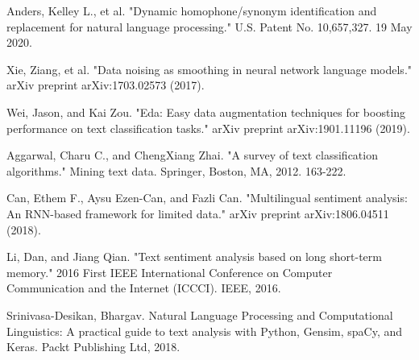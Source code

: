 \documentclass{article}
\begin{document}
\begin{thebibliography}{10}
 Anders, Kelley L., et al. "Dynamic homophone/synonym identification and replacement for natural language processing." U.S. Patent No. 10,657,327. 19 May 2020.

 Xie, Ziang, et al. "Data noising as smoothing in neural network language models." arXiv preprint arXiv:1703.02573 (2017).

 Wei, Jason, and Kai Zou. "Eda: Easy data augmentation techniques for boosting performance on text classification tasks." arXiv preprint arXiv:1901.11196 (2019).

 Aggarwal, Charu C., and ChengXiang Zhai. "A survey of text classification algorithms." Mining text data. Springer, Boston, MA, 2012. 163-222.

 Can, Ethem F., Aysu Ezen-Can, and Fazli Can. "Multilingual sentiment analysis: An RNN-based framework for limited data." arXiv preprint arXiv:1806.04511 (2018).

 Li, Dan, and Jiang Qian. "Text sentiment analysis based on long short-term memory." 2016 First IEEE International Conference on Computer Communication and the Internet (ICCCI). IEEE, 2016.

 Srinivasa-Desikan, Bhargav. Natural Language Processing and Computational Linguistics: A practical guide to text analysis with Python, Gensim, spaCy, and Keras. Packt Publishing Ltd, 2018.


\end{thebibliography}
\end{document}
